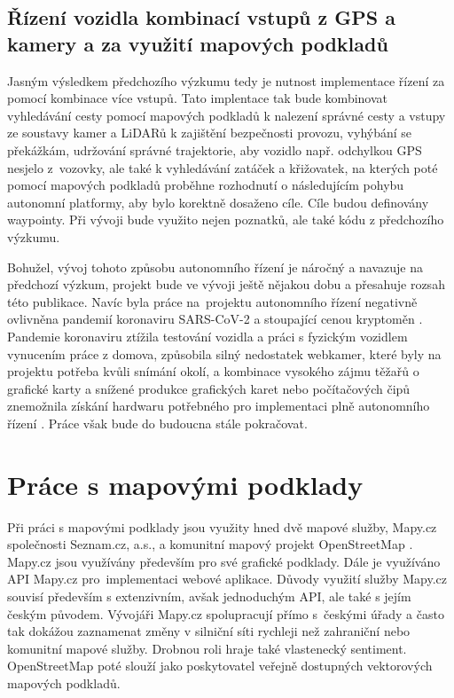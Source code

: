 \documentclass[czech, bachelor]{diploma}
\begin{document}
\section{Řízení vozidla kombinací vstupů z GPS a kamery a za využití mapových podkladů} \label{combination-of-driving-inputs}

Jasným výsledkem předchozího výzkumu tedy je nutnost implementace řízení za pomocí kombinace více vstupů. Tato implentace tak bude
kombinovat vyhledávání cesty pomocí mapových podkladů k nalezení správné cesty a vstupy ze soustavy kamer a LiDARů k zajištění
bezpečnosti provozu, vyhýbání se překážkám, udržování správné trajektorie, aby vozidlo např. odchylkou GPS nesjelo z~vozovky,
ale také k vyhledávání zatáček a křižovatek, na kterých poté pomocí mapových podkladů proběhne rozhodnutí o následujícím pohybu
autonomní platformy, aby bylo korektně dosaženo cíle. Cíle budou definovány waypointy. Při vývoji bude využito nejen poznatků,
ale také kódu z předchozího výzkumu.

Bohužel, vývoj tohoto způsobu autonomního řízení je náročný a navazuje na předchozí výzkum, projekt bude ve vývoji ještě nějakou
dobu a přesahuje rozsah této publikace. Navíc byla práce na~projektu autonomního řízení negativně ovlivněna pandemií koronaviru
SARS-CoV-2 \cite{pandemic-source} a stoupající cenou kryptoměn \cite{bitcoin-rally-source}. Pandemie koronaviru ztížila testování
vozidla a práci s fyzickým vozidlem vynucením práce z domova, způsobila silný nedostatek webkamer, které byly na projektu potřeba
kvůli snímání okolí, a kombinace vysokého zájmu těžařů o grafické karty a snížené produkce grafických karet nebo počítačových čipů
znemožnila získání hardwaru potřebného pro implementaci plně autonomního řízení \cite{bitcoin-miners-gpu-source,
webcam-shortage-source}. Práce však bude do budoucna stále pokračovat.

\chapter{Práce s mapovými podklady} \label{osm-chapter}

Při práci s mapovými podklady jsou využity hned dvě mapové služby, Mapy.cz \cite{mapycz-source} společnosti Seznam.cz, a.s., a
komunitní mapový projekt OpenStreetMap \cite{openstreetmap-source}. Mapy.cz jsou využívány především pro své grafické podklady.
Dále je využíváno API Mapy.cz \cite{apimapycz-source} pro~implementaci webové aplikace. Důvody využití služby Mapy.cz souvisí
především s extenzivním, avšak jednoduchým API, ale také s jejím českým původem. Vývojáři Mapy.cz spolupracují přímo s~českými
úřady a často tak dokážou zaznamenat změny v silniční síti rychleji než zahraniční nebo komunitní mapové služby. Drobnou roli
hraje také vlastenecký sentiment. OpenStreetMap poté slouží jako poskytovatel veřejně dostupných vektorových mapových podkladů.
\end{document}
